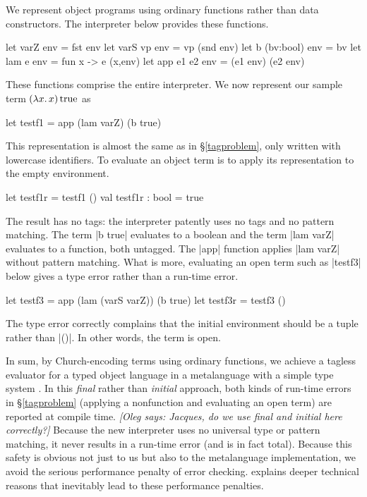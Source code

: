 \documentclass[preprint]{sigplanconf}
\newcommand{\oleg}[1]{{\it [Oleg says: #1]}}
\newcommand{\fun}[1]{\mathopen{\lambda\mathord{#1}.\,}}
\newcommand{\True}{\mathinner{\mathrm{true}}}
\begin{document}
We represent object programs using ordinary functions rather than
data constructors.  The interpreter below provides these functions.
\begin{code}
let varZ env        = fst env
let varS vp env     = vp (snd env)
let b (bv:bool) env = bv
let lam e env       = fun x -> e (x,env)
let app e1 e2 env   = (e1 env) (e2 env)
\end{code}
These functions comprise the entire interpreter.
We now represent our sample term $(\fun{x}x)\True$ as
\begin{code}
let testf1 = app (lam varZ) (b true)
\end{code}
This representation is almost the same as in \S\ref{tagproblem}, only
written with lowercase identifiers. To evaluate an object term is to
apply its representation to the empty environment.
\begin{code}
let testf1r = testf1 ()
val testf1r : bool = true
\end{code}
The result has no tags: the interpreter patently uses no tags and no
pattern matching. The term |b true| evaluates to a boolean and the term
|lam varZ| evaluates to a function, both untagged. The |app| function
applies |lam varZ| without pattern matching. What is more, evaluating an
open term such as |testf3| below gives a type error rather than
a run-time error.
\begin{code}
let testf3 = app (lam (varS varZ)) (b true)
let testf3r = testf3 ()
\end{code}
The type error correctly complains
that the initial environment should be a tuple rather than |()|.
In other words, the term is open.

In sum, by Church\hyp encoding terms using ordinary functions,
we achieve a tagless evaluator
for a typed object language in a metalanguage with a simple type
system \citep{hindley-principal,milner-theory}.  In this \emph{final}
rather than \emph{initial} approach, both kinds of run-time errors
in \S\ref{tagproblem} (applying a nonfunction and evaluating an open
term) are reported at compile time. 
\oleg{Jacques, do we use final and initial here correctly?}
Because the new interpreter uses no
universal type or
pattern matching, it never results in a run-time error (and is in fact
total).  Because this safety is obvious not just to us but also to the
metalanguage implementation, we avoid the serious performance penalty
\citep{WalidICFP02} of error checking.  
explains deeper technical reasons that inevitably lead to these performance
penalties.
\end{document}
